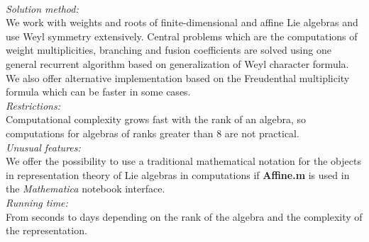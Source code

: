 \documentclass[preprint,12pt]{elsarticle}
\begin{document}
\begin{small}
   \\
{\em Solution method:}\\
We work with weights and roots of finite-dimensional and affine Lie algebras and use Weyl symmetry extensively. Central problems which are the computations of weight multiplicities, branching and fusion coefficients are solved using one general recurrent algorithm based on generalization of Weyl character formula. We also offer alternative implementation based on the Freudenthal multiplicity formula which can be faster in some cases.
   \\
{\em Restrictions:}\\
Computational complexity grows fast  with the rank of an algebra, so computations for algebras of ranks greater than 8 are not practical.
   \\
{\em Unusual features:}\\
We offer the possibility to use a traditional mathematical notation for the objects in representation theory of Lie algebras in computations if {\bf Affine.m} is used in the {\it Mathematica} notebook interface.
   \\
{\em Running time:}\\
From seconds to days depending on the rank of the algebra and the complexity of the representation.
   \\

\end{small}
\end{document}
